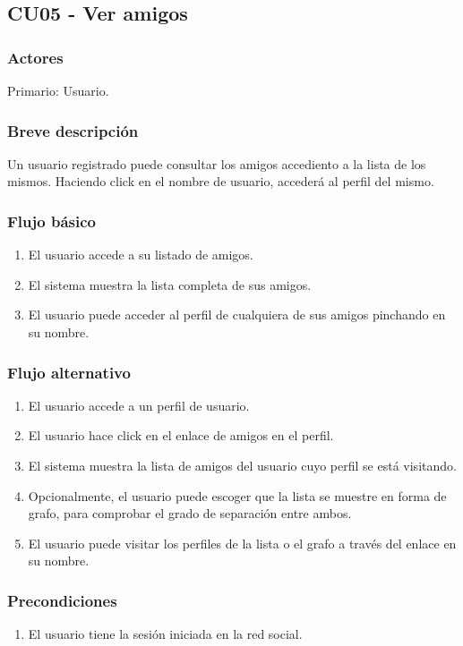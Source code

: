\documentclass[12pt, a4paper, titlepage]{article}
\begin{document}

\subsection{CU05 - Ver amigos}
\subsubsection{Actores}
Primario: Usuario.
\subsubsection{Breve descripción}
Un usuario registrado puede consultar los amigos accediento a la lista de los mismos. Haciendo click en el nombre de usuario, accederá al perfil del mismo.
\subsubsection{Flujo básico}
\begin{enumerate}
	\item El usuario accede a su listado de amigos.
	\item El sistema muestra la lista completa de sus amigos.
	\item El usuario puede acceder al perfil de cualquiera de sus amigos pinchando en su nombre.
\end{enumerate}
\subsubsection{Flujo alternativo}
\begin{enumerate}
	\item El usuario accede a un perfil de usuario.
	\item El usuario hace click en el enlace de amigos en el perfil.
	\item El sistema muestra la lista de amigos del usuario cuyo perfil se está visitando.
	\item Opcionalmente, el usuario puede escoger que la lista se muestre en forma de grafo, para comprobar el grado de separación entre ambos.
	\item El usuario puede visitar los perfiles de la lista o el grafo a través del enlace en su nombre.
\end{enumerate}
\subsubsection{Precondiciones}
\begin{enumerate}
	\item El usuario tiene la sesión iniciada en la red social.
\end{enumerate}
\end{document}
